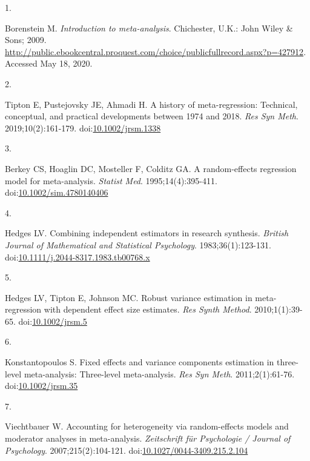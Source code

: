 \documentclass[
]{article}
\newlength{\cslhangindent}
\newlength{\csllabelwidth}
\newlength{\cslentryspacingunit} %
\newenvironment{CSLReferences}[2] %
 {%
  \setlength{\parindent}{0pt}
  \ifodd #1
  \let\oldpar\par
  \def\par{\hangindent=\cslhangindent\oldpar}
  \fi
  \setlength{\parskip}{#2\cslentryspacingunit}
 }%
 {}
\newcommand{\CSLLeftMargin}[1]{\parbox[t]{\csllabelwidth}{#1}}
\newcommand{\CSLRightInline}[1]{\parbox[t]{\linewidth - \csllabelwidth}{#1}\break}
\begin{document}
\noindent

\hypertarget{refs}{}
\begin{CSLReferences}{0}{0}
\leavevmode{}%
\CSLLeftMargin{1. }
\CSLRightInline{Borenstein M. \emph{Introduction to meta-analysis}. Chichester, U.K.: John Wiley \& Sons; 2009. \url{http://public.ebookcentral.proquest.com/choice/publicfullrecord.aspx?p=427912}. Accessed May 18, 2020.}

\leavevmode{}%
\CSLLeftMargin{2. }
\CSLRightInline{Tipton E, Pustejovsky JE, Ahmadi H. A history of meta-regression: Technical, conceptual, and practical developments between 1974 and 2018. \emph{Res Syn Meth}. 2019;10(2):161-179. doi:\href{https://doi.org/10.1002/jrsm.1338}{10.1002/jrsm.1338}}

\leavevmode{}%
\CSLLeftMargin{3. }
\CSLRightInline{Berkey CS, Hoaglin DC, Mosteller F, Colditz GA. A random-effects regression model for meta-analysis. \emph{Statist Med}. 1995;14(4):395-411. doi:\href{https://doi.org/10.1002/sim.4780140406}{10.1002/sim.4780140406}}

\leavevmode{}%
\CSLLeftMargin{4. }
\CSLRightInline{Hedges LV. Combining independent estimators in research synthesis. \emph{British Journal of Mathematical and Statistical Psychology}. 1983;36(1):123-131. doi:\href{https://doi.org/10.1111/j.2044-8317.1983.tb00768.x}{10.1111/j.2044-8317.1983.tb00768.x}}

\leavevmode{}%
\CSLLeftMargin{5. }
\CSLRightInline{Hedges LV, Tipton E, Johnson MC. Robust variance estimation in meta-regression with dependent effect size estimates. \emph{Res Synth Method}. 2010;1(1):39-65. doi:\href{https://doi.org/10.1002/jrsm.5}{10.1002/jrsm.5}}

\leavevmode{}%
\CSLLeftMargin{6. }
\CSLRightInline{Konstantopoulos S. Fixed effects and variance components estimation in three-level meta-analysis: Three-level meta-analysis. \emph{Res Syn Meth}. 2011;2(1):61-76. doi:\href{https://doi.org/10.1002/jrsm.35}{10.1002/jrsm.35}}

\leavevmode{}%
\CSLLeftMargin{7. }
\CSLRightInline{Viechtbauer W. Accounting for heterogeneity via random-effects models and moderator analyses in meta-analysis. \emph{Zeitschrift für Psychologie / Journal of Psychology}. 2007;215(2):104-121. doi:\href{https://doi.org/10.1027/0044-3409.215.2.104}{10.1027/0044-3409.215.2.104}}


\end{CSLReferences}
\end{document}

